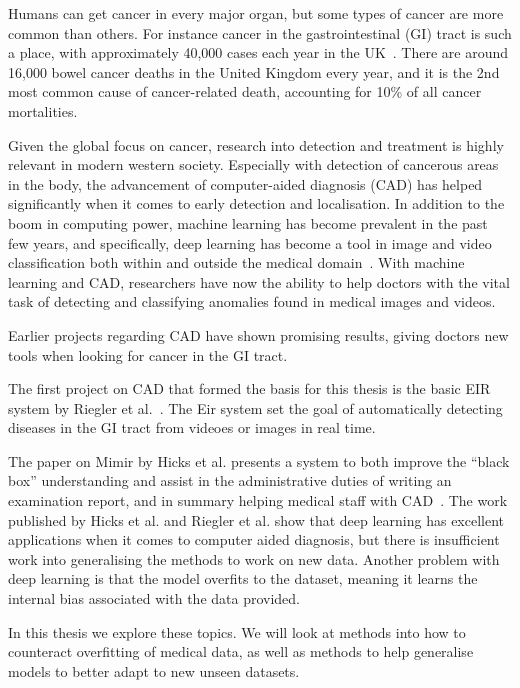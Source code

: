 Humans can get cancer in every major organ, but some types of cancer are more common than others.    
For instance cancer in the gastrointestinal (GI) tract is such a place, with approximately 40,000 cases each year in the UK~\cite{UKCancerBowel}. There are around 16,000 bowel cancer deaths in the United Kingdom every year, and it is the 2nd most common cause of cancer-related death, accounting for 10\% of all cancer mortalities.

Given the global focus on cancer, research into detection and treatment is highly relevant in modern western society. 
Especially with detection of cancerous areas in the body, the advancement of computer-aided diagnosis (CAD) has helped significantly when it comes to early detection and localisation. In addition to the boom in computing power, machine learning has become prevalent in the past few years, and specifically, deep learning has become a tool in image and video classification both within and outside the medical domain~\cite{NIPS2012_4824,DBLP:journals/corr/SimonyanZ14a,DBLP:journals/corr/SimonyanZ14a,DBLP:journals/corr/HeZRS15,DBLP:journals/corr/SzegedyIV16}. 
With machine learning and CAD, researchers have now the ability to help doctors with the vital task of detecting and classifying anomalies found in medical images and videos.

Earlier projects regarding CAD have shown promising results, giving doctors new tools when looking for cancer in the GI tract.

The first project on CAD that formed the basis for this thesis is the basic EIR system by Riegler et al.~\cite{riegler2016eir}.  The Eir system set the goal of automatically detecting diseases in the GI tract from videoes or images in real time. 

The paper on Mimir by Hicks et al. presents a system to both improve the ``black box'' understanding and assist in the administrative duties of writing an examination report, and in summary helping medical staff with CAD~\cite{25953}. 
The work published by Hicks et al. and Riegler et al. show that deep learning has excellent applications when it comes to computer aided diagnosis, but there is insufficient work into generalising the methods to work on new data. Another problem with deep learning is that the model overfits to the dataset, meaning it learns the internal bias associated with the data provided. 

In this thesis we explore these topics. We will look at methods into how to counteract overfitting of medical data, as well as methods to help generalise models to better adapt to new unseen datasets.
